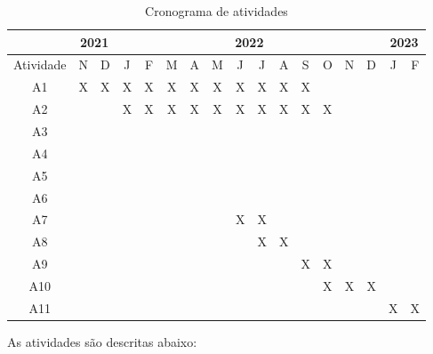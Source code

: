 \documentclass[12pt, a4paper, english, brazil]{article}
\begin{document}
\begin{table}[ht]
\centering
\caption{Cronograma de atividades}
\label{tab:cronograma}
\begin{tabular}{|c|c|c|c|c|c|c|c|c|c|c|c|c|c|c|c|c|}
\hline
          & \multicolumn{2}{c|}{2021} & \multicolumn{12}{c|}{2022}                    & \multicolumn{2}{c|}{2023} \\ \hline
Atividade & N           & D           & J & F & M & A & M & J & J & A & S & O & N & D & J           & F           \\ \hline
A1        & X           & X           & X & X & X & X & X & X & X & X & X &   &   &   &             &             \\ \hline
A2        &             &             & X & X & X & X & X & X & X & X & X & X &   &   &             &             \\ \hline
A3        &             &             &   &   &   &   &   &   &   &   &   &   &   &   &             &             \\ \hline
A4        &             &             &   &   &   &   &   &   &   &   &   &   &   &   &             &             \\ \hline
A5        &             &             &   &   &   &   &   &   &   &   &   &   &   &   &             &             \\ \hline
A6        &             &             &   &   &   &   &   &   &   &   &   &   &   &   &             &             \\ \hline
A7        &             &             &   &   &   &   &   & X & X &   &   &   &   &   &             &             \\ \hline
A8        &             &             &   &   &   &   &   &   & X & X &   &   &   &   &             &             \\ \hline
A9        &             &             &   &   &   &   &   &   &   &   & X & X &   &   &             &             \\ \hline
A10       &             &             &   &   &   &   &   &   &   &   &   & X & X & X &             &             \\ \hline
A11       &             &             &   &   &   &   &   &   &   &   &   &   &   &   & X           & X           \\ \hline
\end{tabular}
\end{table}

As atividades são descritas abaixo:
\end{document}

